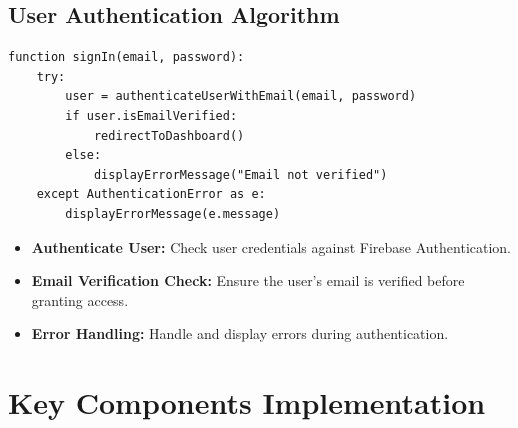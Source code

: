 \documentclass[12pt,a4paper]{report}
\begin{document}
\subsection{User Authentication Algorithm}
\begin{lstlisting}[caption=User Authentication Algorithm]
   function signIn(email, password):
    try:
        user = authenticateUserWithEmail(email, password)
        if user.isEmailVerified:
            redirectToDashboard()
        else:
            displayErrorMessage("Email not verified")
    except AuthenticationError as e:
        displayErrorMessage(e.message)
   \end{lstlisting}
\begin{itemize}
   \item \textbf{Authenticate User:} Check user credentials against Firebase Authentication.
   \item \textbf{Email Verification Check:} Ensure the user’s email is verified before granting access.
   \item \textbf{Error Handling:} Handle and display errors during authentication.
\end{itemize}


\section{Key Components Implementation}
\end{document}
